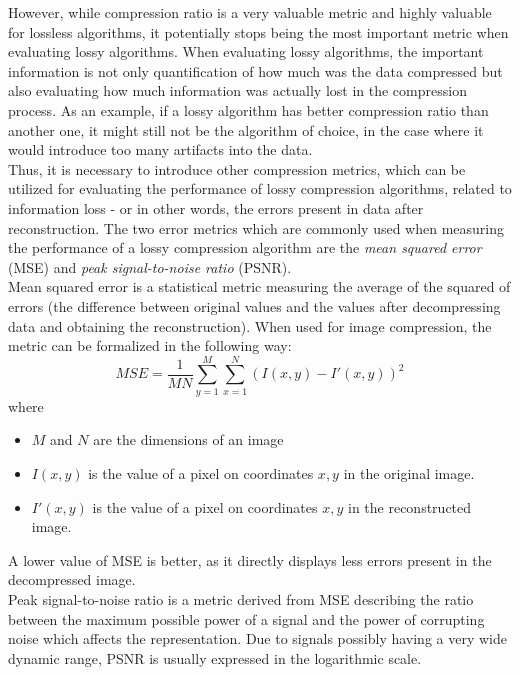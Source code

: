 \documentclass[thesis=M,english]{FITthesis}[2012/10/20]
\begin{document}
However, while compression ratio is a very valuable metric and
highly valuable for lossless algorithms, it potentially stops
being the most important metric when evaluating lossy algorithms.
When evaluating lossy algorithms, the important information is not
only quantification of how much was the data compressed but also
evaluating how much information was actually lost in the compression
process. As an example, if a lossy algorithm has better compression
ratio than another one, it might still not be the algorithm of choice,
in the case where it would introduce too many artifacts into the data.
\\

Thus, it is necessary to introduce other compression metrics, which
can be utilized for evaluating the performance of lossy compression
algorithms, related to information loss - or in other words, the errors
present in data after reconstruction. The two error metrics which are
commonly used when measuring the performance of a lossy compression
algorithm are the \emph{mean squared error} (MSE) and \emph{peak
signal-to-noise ratio} (PSNR).\cite{imgcomprintro}
\\

Mean squared error is a statistical metric measuring the average
of the squared of errors (the difference between original values and
the values after decompressing data and obtaining the reconstruction).
When used for image compression, the metric can be formalized in the
following way:
\begin{equation}
    MSE = \frac{1}{MN}\sum_{y=1}^{M}\sum_{x=1}^{N}(I(x,y) - I'(x,y))^2
\end{equation}
where
\begin{itemize}
    \item $M$ and $N$ are the dimensions of an image
    \item $I(x, y)$ is the value of a pixel on coordinates $x, y$ in the
    original image.
    \item $I'(x, y)$ is the value of a pixel on coordinates $x, y$ in the
    reconstructed image.
\end{itemize}
A lower value of MSE is better, as it directly displays less errors present
in the decompressed image.
\\

Peak signal-to-noise ratio is a metric derived from MSE describing the ratio
between the maximum possible power of a signal and the power of corrupting
noise which affects the representation. Due to signals possibly having
a very wide dynamic range, PSNR is usually expressed in the logarithmic scale.
\\
\end{document}
